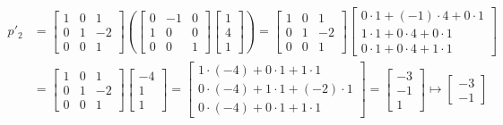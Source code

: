 \documentclass{article}
\begin{document}
\begin{align*}
	p'_2 & =  \begin{bmatrix}1&0&1\\ 0&1&-2\\0&0&1\end{bmatrix} \left( \begin{bmatrix}0&-1&0\\ 1&0&0\\ 0&0&1\end{bmatrix}\begin{bmatrix}1\\ 4\\ 1\end{bmatrix} \right)  =  \begin{bmatrix}1&0&1\\ 0&1&-2\\0&0&1\end{bmatrix}\begin{bmatrix}0\cdot 1+\left(-1\right)\cdot 4+0\cdot 1\\ 1\cdot 1+0\cdot 4+0\cdot 1\\ 0\cdot 1+0\cdot 4+1\cdot 1\end{bmatrix} \\
	& = \begin{bmatrix}1&0&1\\ 0&1&-2\\0&0&1\end{bmatrix}\begin{bmatrix}-4\\ 1\\ 1\end{bmatrix} = \begin{bmatrix}1\cdot \left(-4\right)+0\cdot 1+1\cdot 1\\ 0\cdot \left(-4\right)+1\cdot 1+\left(-2\right)\cdot 1\\ 0\cdot \left(-4\right)+0\cdot 1+1\cdot 1\end{bmatrix} = \begin{bmatrix}-3\\ -1\\ 1\end{bmatrix} \mapsto \begin{bmatrix}-3\\ -1\end{bmatrix}
\end{align*}
\end{document}
